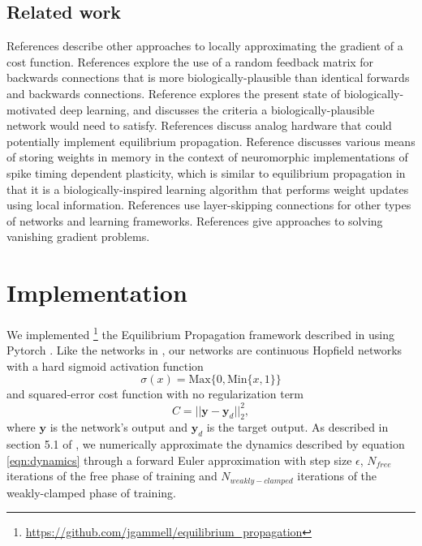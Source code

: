 \documentclass[utf8]{frontiersSCNS}
\newcommand{\mtx}[1]{\mathbf{#1}}
\begin{document}
\subsection{Related work}


References \citep{lee2015, xie2003, pineda1987} describe other approaches to locally approximating the gradient of a cost function. References \citep{lillicrap2014, crafton2019} explore the use of a random feedback matrix for backwards connections that is more biologically-plausible than identical forwards and backwards connections. Reference \citep{bartunov2018} explores the present state of biologically-motivated deep learning, and \citep{bengio2015} discusses the criteria a biologically-plausible network would need to satisfy. References \citep{shainline2019, davies2018, nahmias2013} discuss analog hardware that could potentially implement equilibrium propagation. Reference \citep{pedroni2019} discusses various means of storing weights in memory in the context of neuromorphic implementations of spike timing dependent plasticity, which is similar to equilibrium propagation in that it is a biologically-inspired learning algorithm that performs weight updates using local information. References \citep{he2015, srivastava2015, xiaohu2011, krishnan2019} use layer-skipping connections for other types of networks and learning frameworks. References \citep{ioffe2015, glorot2010} give approaches to solving vanishing gradient problems.

\section{Implementation}
\label{sec:implementation}

We implemented \footnote{\url{https://github.com/jgammell/equilibrium_propagation}} the Equilibrium Propagation framework described in \citep{scellier17} using Pytorch \citep{pytorch2019}. Like the networks in \citep{scellier17}, our networks are continuous Hopfield networks with a hard sigmoid activation function $$\sigma(x)=\text{Max}\{0, \text{Min}\{x, 1\}\}$$ and squared-error cost function with no regularization term $$C=||\mtx{y}-\mtx{y}_d||_2^2,$$ where $\mtx{y}$ is the network's output and $\mtx{y}_d$ is the target output. As described in section 5.1 of \citep{scellier17}, we numerically approximate the dynamics described by equation \ref{eqn:dynamics} through a forward Euler approximation with step size $\epsilon$, $N_{free}$ iterations of the free phase of training and $N_{weakly-clamped}$ iterations of the weakly-clamped phase of training.
\end{document}
